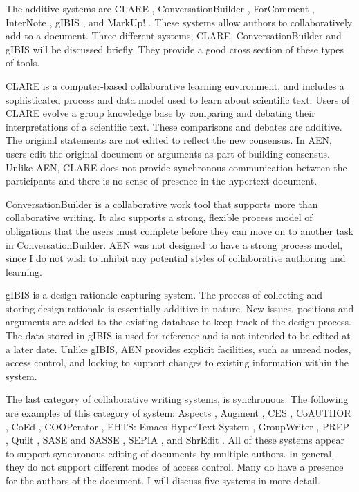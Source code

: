 The additive systems are CLARE \cite{csdl-93-21}, ConversationBuilder
\cite{Kaplan92}, ForComment \cite{Ellis91,Opper88}, InterNote
\cite{Malcolm91}, gIBIS \cite{Conklin88}, and MarkUp! \cite{Allen93}.
These systems allow authors to collaboratively add to a document.  Three
different systems, CLARE, ConversationBuilder and gIBIS will be discussed
briefly.  They provide a good cross section of these types of tools.

CLARE is a computer-based collaborative learning environment, and
includes a sophisticated process and data model used to learn about
scientific text.  Users of CLARE evolve a group knowledge base by
comparing and debating their interpretations of a scientific text.
These comparisons and debates are additive.  The original statements
are not edited to reflect the new consensus.  In AEN, users edit the
original document or arguments as part of building consensus.  Unlike
AEN, CLARE does not provide synchronous communication between the
participants and there is no sense of presence in the hypertext
document.

ConversationBuilder is a collaborative work tool that supports more than
collaborative writing.  It also supports a strong, flexible process
model of obligations that the users must complete before they can move
on to another task in ConversationBuilder.  AEN was not designed to
have a strong process model, since I do not wish to inhibit any
potential styles of collaborative authoring and learning.

gIBIS is a design rationale capturing system.  The process of collecting
and storing design rationale is essentially additive in nature.  New
issues, positions and arguments are added to the existing database to keep
track of the design process.  The data stored in gIBIS is used for
reference and is not intended to be edited at a later date.  Unlike gIBIS,
AEN provides explicit facilities, such as unread nodes, access control, and
locking to support changes to existing information within the system.

The last category of collaborative writing systems, is synchronous.  The
following are examples of this category of system: Aspects
\cite{Allen93,Baecker93}, Augment \cite{Engelbart84}, CES
\cite{Ellis91,Greif87}, CoAUTHOR \cite{Bowers91}, CoEd \cite{Ellis89},
COOPerator \cite{Michels95}, EHTS: Emacs HyperText System \cite{Wiil92},
GroupWriter \cite{Malcolm91,Malcolm93}, PREP \cite{Neuwirth90,Neuwirth92},
Quilt \cite{Fish88}, SASE and SASSE \cite{Baecker93}, SEPIA \cite{Haake92},
and ShrEdit \cite{Cogn92}.  All of these systems appear to support
synchronous editing of documents by multiple authors.  In general, they do
not support different modes of access control.  Many do have a presence for
the authors of the document.  I will discuss five systems in more detail.

